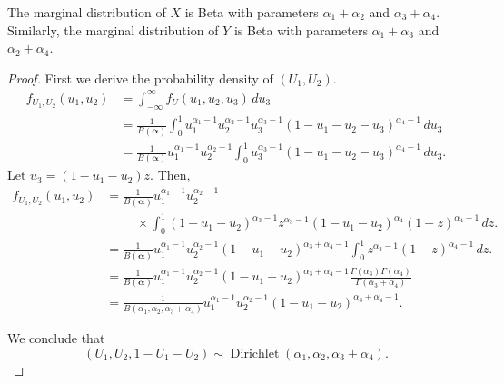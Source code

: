 \begin{proposition}
  \label{prop:marginal-distributions}
  The marginal distribution of $X$ is Beta with parameters $\alpha_1 +
  \alpha_2$ and $\alpha_3 + \alpha_4$. Similarly, the marginal distribution of
  $Y$ is Beta with parameters $\alpha_1 + \alpha_3$ and $\alpha_2 + \alpha_4$.
\end{proposition}

\begin{proof}
  First we derive the probability density of $(U_1, U_2)$.
  \begin{equation}
    \label{eq:dist-u1-u2}
    \begin{split}
      f_{U_1, U_2}(u_1, u_2) &= \int_{-\infty}^{\infty} f_{U}(u_1,u_2,u_3) \, du_3 \\ 
      &= \frac{1}{B(\boldsymbol{\alpha})}\int_0^1 u_1^{\alpha_1-1}u_2^{\alpha_2-1}u_3^{\alpha_3-1}(1-u_1-u_2-u_3)^{\alpha_4-1} \, du_3 \\
      &= \frac{1}{B(\boldsymbol{\alpha})}u_1^{\alpha_1-1}u_2^{\alpha_2-1}\int_0^1 u_3^{\alpha_3-1}(1-u_1-u_2-u_3)^{\alpha_4-1} \, du_3.
    \end{split}
  \end{equation}
  Let $u_3 = (1 - u_1 - u_2)z$. Then,
  \begin{equation}
    \begin{split}
      f_{U_1, U_2}(u_1, u_2) &= \frac{1}{B(\boldsymbol{\alpha})}u_1^{\alpha_1-1}u_2^{\alpha_2-1} \\
      &\hspace{1cm} \times \int_0^1 (1-u_1-u_2)^{\alpha_3-1}z^{\alpha_3-1}(1-u_1-u_2)^{\alpha_4}(1-z)^{\alpha_4-1} \, dz. \\
      &= \frac{1}{B(\boldsymbol{\alpha})}u_1^{\alpha_1-1}u_2^{\alpha_2-1}(1-u_1-u_2)^{\alpha_3+\alpha_4-1}\int_0^1 z^{\alpha_3-1}(1-z)^{\alpha_4-1} \, dz. \\
      &= \frac{1}{B(\boldsymbol{\alpha})}u_1^{\alpha_1-1}u_2^{\alpha_2-1}(1-u_1-u_2)^{\alpha_3+\alpha_4-1}\frac{\Gamma(\alpha_3)\Gamma(\alpha_4)}{\Gamma(\alpha_3 + \alpha_4)} \\
      &= \frac{1}{B(\alpha_1, \alpha_2, \alpha_3+\alpha_4)}u_1^{\alpha_1-1}u_2^{\alpha_2-1}(1-u_1-u_2)^{\alpha_3+\alpha_4-1}.
    \end{split}
  \end{equation}

We conclude that
$$(U_1, U_2, 1-U_1-U_2) \sim
\operatorname{Dirichlet}(\alpha_1,\alpha_2,\alpha_3+\alpha_4).$$


\end{proof}

